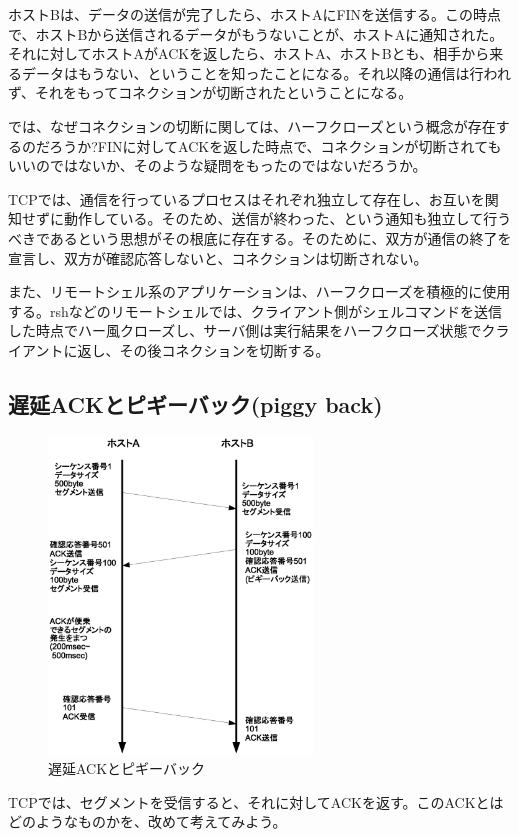 ホストBは、データの送信が完了したら、ホストAにFINを送信する。この時点で、ホストBから送信されるデータがもうないことが、ホストAに通知された。それに対してホストAがACKを返したら、ホストA、ホストBとも、相手から来るデータはもうない、ということを知ったことになる。それ以降の通信は行われず、それをもってコネクションが切断されたということになる。


では、なぜコネクションの切断に関しては、ハーフクローズという概念が存在するのだろうか?FINに対してACKを返した時点で、コネクションが切断されてもいいのではないか、そのような疑問をもったのではないだろうか。

TCPでは、通信を行っているプロセスはそれぞれ独立して存在し、お互いを関知せずに動作している。そのため、送信が終わった、という通知も独立して行うべきであるという思想がその根底に存在する。そのために、双方が通信の終了を宣言し、双方が確認応答しないと、コネクションは切断されない。

また、リモートシェル系のアプリケーションは、ハーフクローズを積極的に使用する。rshなどのリモートシェルでは、クライアント側がシェルコマンドを送信した時点でハー風クローズし、サーバ側は実行結果をハーフクローズ状態でクライアントに返し、その後コネクションを切断する。

\subsection{遅延ACKとピギーバック(piggy back)}
\begin{figure}
	\includegraphics[width=7cm, clip]{draw/tcp03n.eps}
	\caption{遅延ACKとピギーバック}
	\label{fig:tcp03}
\end{figure}

TCPでは、セグメントを受信すると、それに対してACKを返す。このACKとはどのようなものかを、改めて考えてみよう。

